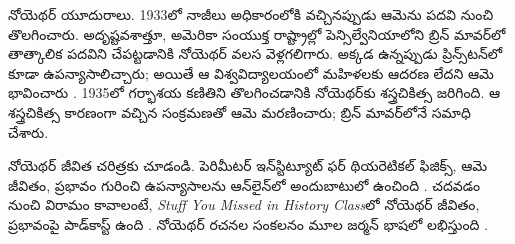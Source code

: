 \documentclass[../../../include/open-logic-section]{subfiles}
\begin{document}
నోయెథర్ యూదురాలు. 1933లో నాజీలు అధికారంలోకి వచ్చినప్పుడు ఆమెను పదవి నుంచి తొలగించారు. అదృష్టవశాత్తూ, అమెరికా సంయుక్త రాష్ట్రాల్లో పెన్సిల్వేనియాలోని బ్రిన్ మావర్‌లో తాత్కాలిక పదవిని చేపట్టడానికి నోయెథర్ వలస వెళ్లగలిగారు. అక్కడ ఉన్నప్పుడు ప్రిన్స్‌టన్‌లో కూడా ఉపన్యాసాలిచ్చారు; అయితే ఆ విశ్వవిద్యాలయంలో మహిళలకు ఆదరణ లేదని ఆమె భావించారు \citep[81]{Dick1981}. 1935లో గర్భాశయ కణితిని తొలగించడానికి నోయెథర్‌కు శస్త్రచికిత్స జరిగింది. ఆ శస్త్రచికిత్స కారణంగా వచ్చిన సంక్రమణతో ఆమె మరణించారు; బ్రిన్ మావర్‌లోనే సమాధి చేశారు.

\begin{reading}
నోయెథర్ జీవిత చరిత్రకు \citet{Dick1981} చూడండి. పెరిమీటర్ ఇన్‌స్టిట్యూట్ ఫర్ థియరెటికల్ ఫిజిక్స్, ఆమె జీవితం, ప్రభావం గురించి ఉపన్యాసాలను ఆన్‌లైన్‌లో అందుబాటులో ఉంచింది \citep{Perimeter2015}. చదవడం నుంచి విరామం కావాలంటే, \emph{Stuff You Missed in History Class}లో నోయెథర్ జీవితం, ప్రభావంపై పాడ్‌కాస్ట్ ఉంది \citep{Frey2015}. నోయెథర్ రచనల సంకలనం మూల జర్మన్ భాషలో లభిస్తుంది \citep{Noether1983}.
\end{reading}
\end{document}

